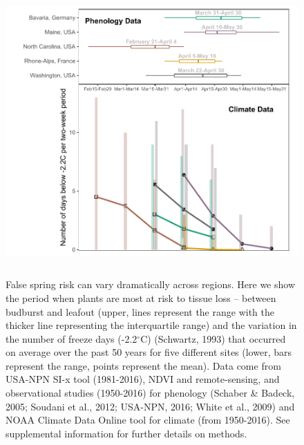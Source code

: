 \documentclass{article}\usepackage[]{graphicx}\usepackage[]{color}
\begin{document}
\begin{figure} [H] 
 \begin{center}
 \includegraphics[width=12cm, height=11cm]{..//figures/regionalrisk_sites_color.pdf} 
 \caption{False spring risk can vary dramatically across regions. Here we show the period when plants are most at risk to tissue loss -- between budburst and leafout (upper, lines represent the range with the thicker line representing the interquartile range) and the variation in the number of freeze days (-2.2$^{\circ}$C) (Schwartz, 1993) that occurred on average over the past 50 years for five different sites (lower, bars represent the range, points represent the mean). Data come from USA-NPN SI-x tool (1981-2016), NDVI and remote-sensing, and observational studies (1950-2016) for phenology (Schaber \& Badeck, 2005; Soudani et al., 2012; USA-NPN, 2016; White et al., 2009) and NOAA Climate Data Online tool for climate (from 1950-2016). See supplemental information for further details on methods. } \label{fig:region}  
 \end{center}
 \end{figure}
\end{document}
